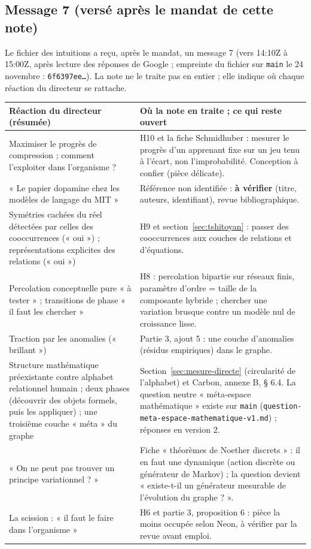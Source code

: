 \documentclass[a4paper,11pt]{article}
\begin{document}
\subsection{Message 7 (versé après le mandat de cette note)}\label{sec:message7}
Le fichier des intuitions a reçu, après le mandat, un message 7 (vers 14:10Z à 15:00Z, après lecture des réponses de Google ; empreinte du fichier sur \texttt{main} le 24 novembre : \texttt{6f6397ee…}). La note ne le traite pas en entier ; elle indique où chaque réaction du directeur se rattache.
{\small
\begin{longtable}{@{}>{\raggedright\arraybackslash}p{6.6cm}>{\raggedright\arraybackslash}p{9.6cm}@{}}
\toprule \textbf{Réaction du directeur (résumée)} & \textbf{Où la note en traite ; ce qui reste ouvert}\\ \midrule\endhead
\bottomrule\endfoot
Maximiser le progrès de compression ; comment l'exploiter dans l'organisme ? & H10 et la fiche Schmidhuber : mesurer le progrès d'un apprenant fixe sur un jeu tenu à l'écart, non l'improbabilité. Conception à confier (pièce délicate).\\ \midrule
« Le papier dopamine chez les modèles de langage du MIT » & Référence non identifiée : \textbf{à vérifier} (titre, auteurs, identifiant), revue bibliographique.\\ \midrule
Symétries cachées du réel détectées par celles des cooccurrences (« oui ») ; représentations explicites des relations (« oui ») & H9 et section~\ref{sec:tshitoyan} : passer des cooccurrences aux couches de relations et d'équations.\\ \midrule
Percolation conceptuelle pure « à tester » ; transitions de phase « il faut les chercher » & H8 : percolation bipartie sur réseaux finis, paramètre d'ordre = taille de la composante hybride ; chercher une variation brusque contre un modèle nul de croissance lisse.\\ \midrule
Traction par les anomalies (« brillant ») & Partie 3, ajout 5 : une couche d'anomalies (résidus empiriques) dans le graphe.\\ \midrule
Structure mathématique préexistante contre alphabet relationnel humain ; deux phases (découvrir des objets formels, puis les appliquer) ; une troisième couche « méta » du graphe & Section~\ref{sec:mesure-directe} (circularité de l'alphabet) et Carbon, annexe B, § 6.4. La question neutre « méta-espace mathématique » existe sur \texttt{main} (\texttt{question-meta-espace-mathematique-v1.md}) ; réponses en version 2.\\ \midrule
« On ne peut pas trouver un principe variationnel ? » & Fiche « théorèmes de Noether discrets » : il en faut une dynamique (action discrète ou générateur de Markov) ; la question devient « existe-t-il un générateur mesurable de l'évolution du graphe ? ».\\ \midrule
La scission : « il faut le faire dans l'organisme » & H6 et partie 3, proposition 6 : pièce la moins occupée selon Neon, à vérifier par la revue avant emploi.\\
\end{longtable}}
\end{document}
